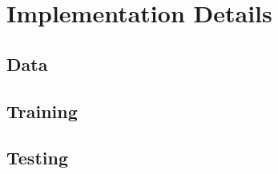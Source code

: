 \chapter{Implementation Details}\label{chap:setup}


\section{Data}


\section{Training}


\section{Testing}
